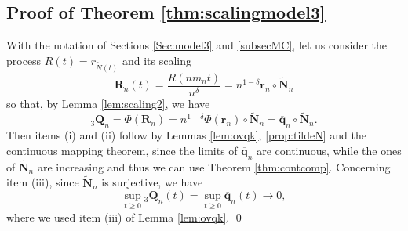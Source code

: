 \documentclass[]{amsart}
\numberwithin{equation}{section}
\theoremstyle{remark}
\theoremstyle{definition}
\begin{document}
\subsection{Proof of Theorem \ref{thm:scalingmodel3}}
With the notation of Sections \ref{Sec:model3} and \ref{subsecMC}, let us consider the process $R(t)=r_{\widetilde{N}(t)}$ and its scaling
\begin{equation*}
	\mathbf{R}_n(t)=\frac{R(nm_nt)}{n^\delta}=n^{1-\delta}\mathbf{r}_n \circ \widetilde{\mathbf{N}}_n
\end{equation*}
so that, by Lemma \ref{lem:scaling2}, we have
\begin{equation*}
{}_3\mathbf{Q}_n=\Phi(\mathbf{R}_n)=n^{1-\delta}\Phi(\mathbf{r}_n)\circ \widetilde{\mathbf{N}}_n=\overline{\mathbf{q}}_n\circ \widetilde{\mathbf{N}}_n.
\end{equation*}
Then items (i) and (ii) follow by Lemmas \ref{lem:ovqk}, \ref{prop:tildeN} and the continuous mapping theorem, since the limits of $\overline{\mathbf{q}}_n$ are continuous, while the ones of $\widetilde{\mathbf{N}}_n$ are increasing and thus we can use Theorem \ref{thm:contcomp}. Concerning item (iii), since $\mathbf{\widetilde{N}}_n$ is surjective, we have
\begin{equation*}
	\sup_{t \ge 0}{}_3\mathbf{Q}_n(t)=\sup_{t \ge 0}\overline{\mathbf{q}}_n(t) \to 0,
\end{equation*}
where we used item (iii) of Lemma \ref{lem:ovqk}.
\hfill \qed
\end{document}
